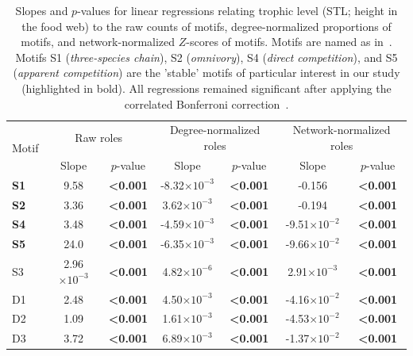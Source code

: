 \documentclass[12pt]{article}
\begin{document}
\begin{spacing}{2.0}
    \begin{table}[h!]
        \caption{Slopes and $p$-values for linear regressions relating trophic level (STL; height in the food web) to the raw counts of motifs, degree-normalized proportions of motifs, and network-normalized $Z$-scores of motifs. Motifs are named as in~\citet{Stouffer2007}. Motifs S1 (\emph{three-species chain}), S2 (\emph{omnivory}), S4 (\emph{direct competition}), and S5 (\emph{apparent competition}) are the 'stable' motifs of particular interest in our study (highlighted in bold). All regressions remained significant after applying the correlated Bonferroni correction~\citep{Drezner2016}.}
        \label{TL_lms}
        \begin{tabular}{l | c c c c c c }
        \multirow{2}{*}{Motif} & \multicolumn{2}{c}{Raw roles} & \multicolumn{2}{c}{Degree-normalized roles} & \multicolumn{2}{c}{Network-normalized roles} \\
        & Slope & $p$-value & Slope & $p$-value & Slope & $p$-value \\
        \hline
        \textbf{S1}	&	9.58	&	\textbf{\textless0.001}	&	-8.32$\times10^{-3}$	&	\textbf{\textless0.001}	&	-0.156	&	\textbf{\textless0.001}	\\
        \textbf{S2}	&	3.36	&	\textbf{\textless0.001}	&	3.62$\times10^{-3}$	&	\textbf{\textless0.001}	&	-0.194	&	\textbf{\textless0.001}	\\
        \textbf{S4}	&	3.48	&	\textbf{\textless0.001}	&	-4.59$\times10^{-3}$	&	\textbf{\textless0.001}	&	-9.51$\times10^{-2}$	&	\textbf{\textless0.001}	\\
        \textbf{S5}	&	24.0	&	\textbf{\textless0.001}	&	-6.35$\times10^{-3}$	&	\textbf{\textless0.001}	&	-9.66$\times10^{-2}$	&	\textbf{\textless0.001}	\\
        \hline													
        S3	&	2.96$\times10^{-3}$	&	\textbf{\textless0.001}	&	4.82$\times10^{-6}$	&	\textbf{\textless0.001}	&	2.91$\times10^{-3}$	&	\textbf{\textless0.001}	\\
        D1	&	2.48	&	\textbf{\textless0.001}	&	4.50$\times10^{-3}$	&	\textbf{\textless0.001}	&	-4.16$\times10^{-2}$	&	\textbf{\textless0.001}	\\
        D2	&	1.09	&	\textbf{\textless0.001}	&	1.61$\times10^{-3}$	&	\textbf{\textless0.001}	&	-4.53$\times10^{-2}$	&	\textbf{\textless0.001}	\\
        D3	&	3.72	&	\textbf{\textless0.001}	&	6.89$\times10^{-3}$	&	\textbf{\textless0.001}	&	-1.37$\times10^{-2}$	&	\textbf{\textless0.001}	\\

\end{tabular}
\end{table}
\end{spacing}
\end{document}
